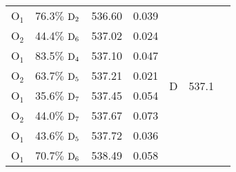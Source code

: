 \documentclass[12pt]{article}
\begin{document}
\begin{table}[!h]
\begin{tabular}{c@{\hskip 0.22in}c@{\hskip 0.22in}c@{\hskip 0.22in}c@{\hskip 0.52in}c@{\hskip 0.22in}c@{\hskip 0.22in}c}
    O$_1$
 &   76.3$\%$ $\rm D_2$  & 536.60 & 0.039 
 \vspace{0.1in}\\
    O$_2$
 &   44.4$\%$ $\rm D_6$  & 537.02 & 0.024 & \multirow{6}{*}{D} & \multirow{6}{*}{537.1} \\
    O$_1$
 &   83.5$\%$ $\rm D_4$  & 537.10 & 0.047 \\
    O$_2$
 &   63.7$\%$ $\rm D_5$  & 537.21 & 0.021 \\
    O$_1$
 &   35.6$\%$ $\rm D_7$   & 537.45 & 0.054 \\
    O$_2$
 &   44.0$\%$ $\rm D_7$   & 537.67 & 0.073 \\
    O$_1$
 &   43.6$\%$ $\rm D_5$  & 537.72 & 0.036 
 \vspace{0.1in}\\
    O$_1$
 &   70.7$\%$ $\rm D_6$  & 538.49 & 0.058 \\
 \hline
 \hline
   \end{tabular}
   \label{table: thymine_k_oxygen}
\end{table}
\newpage
\end{document}
